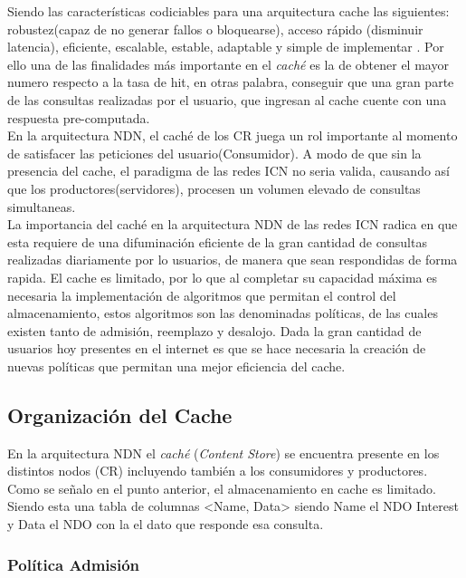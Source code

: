 \documentclass[12pt]{ociamthesis}  %
\begin{document}
Siendo las características codiciables para una arquitectura cache las siguientes: robustez(capaz de no generar fallos o bloquearse), acceso rápido (disminuir latencia), eficiente, escalable, estable, adaptable y simple de implementar \cite{wang1999survey}. Por ello una de las finalidades más importante en el \textit{caché} es la de obtener el mayor numero respecto a la tasa de hit, en otras palabra, conseguir que una gran parte de las consultas realizadas por el usuario, que ingresan al cache cuente con una respuesta pre-computada.\\

En la arquitectura NDN, el caché de los CR juega un rol importante al momento de satisfacer las peticiones del usuario(Consumidor). A modo de que sin la presencia del cache, el paradigma de las redes ICN no seria valida, causando así que los productores(servidores), procesen un volumen elevado de consultas simultaneas.\\

La importancia del caché en la arquitectura NDN de las redes ICN radica en que esta requiere de una difuminación eficiente de la gran cantidad de consultas realizadas diariamente por lo usuarios, de manera que sean respondidas de forma rapida. El cache es limitado, por lo que al completar su capacidad máxima es necesaria la  implementación de algoritmos que permitan el control del almacenamiento, estos algoritmos son las denominadas políticas, de las cuales existen tanto de admisión, reemplazo y desalojo. Dada la gran cantidad de usuarios hoy presentes en el internet es que se hace necesaria la creación de nuevas políticas que permitan una mejor eficiencia del cache.\\

\subsection{Organización del Cache}

En la arquitectura NDN el \textit{caché} (\textit{Content Store}) se encuentra presente en los distintos nodos (CR) incluyendo también a los consumidores y productores. Como se señalo en el punto anterior, el almacenamiento en cache es limitado. Siendo esta una tabla de columnas <Name, Data> siendo Name el NDO Interest y Data el NDO con la el dato que responde esa consulta.

\subsubsection{Política Admisión}
\end{document}
